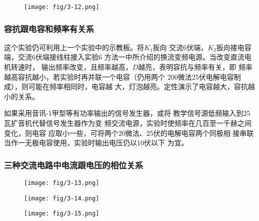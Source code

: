 \begin{figure}[htp]
    \centering
\texttt{[image: fig/3-12.png]}
    \caption{}
\end{figure}

\subsubsection{容抗跟电容和频率有关系}
这个实验仍可利用上一个实验中的示教板。将$K_1$扳向
交流6伏端，$K_2$扳向接电容端，交流6伏端接线柱接入实验6
方法一中所介绍的换流变频电源。当改变直流电机转速时，
输出频率改变，且频率越高，$D$越亮，表明容抗与频率有关，即
频率越高容抗越小，若实验时再并联一个电容（仍用两个
200微法25伏电解电容制成），则可能在频率相同时，电容越
大，灯泡越亮。定性演示了电容越大，容抗越小的关系。

如果采用音讯-1甲型等有功率输出的信号发生器，或将
教学信号源低频输入到25瓦扩音机代替信号发生器作为变
频交流电源，实验时使频率在几百至一千赫之间变化，则电容
应取小一些，可将两个20微法、25伏的电解电容两个同极相
接串联当作一无极电容使用，实验时输出电压仍以10伏以下
为宜。

\subsubsection{三种交流电路中电流跟电压的相位关系}

\begin{figure}[htp]\centering
    \begin{minipage}[t]{0.48\textwidth}
    \centering
    \texttt{[image: fig/3-13.png]}
    \caption{}
    \end{minipage}
    \begin{minipage}[t]{0.48\textwidth}
    \centering    \texttt{[image: fig/3-14.png]}
    \caption{}
    \end{minipage}
    \end{figure}

    \begin{figure}[htp]
        \centering
    \texttt{[image: fig/3-15.png]}
        \caption{}
    \end{figure}

